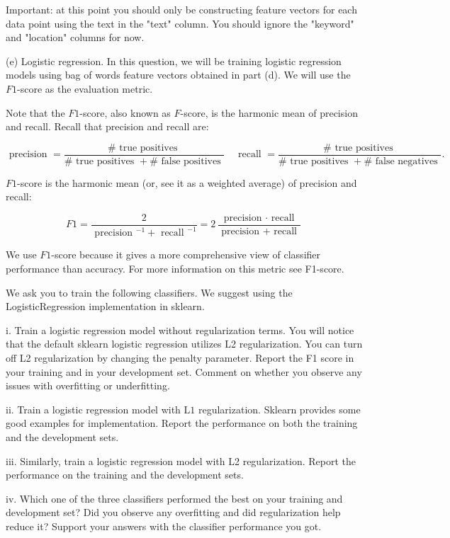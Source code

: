\documentclass[10pt]{article}
\begin{document}
Important: at this point you should only be constructing feature vectors for each data point using the text in the "text" column. You should ignore the "keyword" and "location" columns for now.

(e) Logistic regression. In this question, we will be training logistic regression models using bag of words feature vectors obtained in part (d). We will use the $F 1$-score as the evaluation metric.

Note that the $F 1$-score, also known as $F$-score, is the harmonic mean of precision and recall. Recall that precision and recall are:

$$
\text { precision }=\frac{\# \text { true positives }}{\# \text { true positives }+\# \text { false positives }} \quad \text { recall }=\frac{\# \text { true positives }}{\# \text { true positives }+\# \text { false negatives }} \text {. }
$$

$F 1$-score is the harmonic mean (or, see it as a weighted average) of precision and recall:

$$
F 1=\frac{2}{\text { precision }^{-1}+\text { recall }^{-1}}=2 \frac{\text { precision } \cdot \text { recall }}{\text { precision }+ \text { recall }}
$$

We use $F 1$-score because it gives a more comprehensive view of classifier performance than accuracy. For more information on this metric see F1-score.

We ask you to train the following classifiers. We suggest using the LogisticRegression implementation in sklearn.

i. Train a logistic regression model without regularization terms. You will notice that the default sklearn logistic regression utilizes L2 regularization. You can turn off L2 regularization by changing the penalty parameter. Report the F1 score in your training and in your development set. Comment on whether you observe any issues with overfitting or underfitting.

ii. Train a logistic regression model with $\mathrm{L} 1$ regularization. Sklearn provides some good examples for implementation. Report the performance on both the training and the development sets.

iii. Similarly, train a logistic regression model with L2 regularization. Report the performance on the training and the development sets.

iv. Which one of the three classifiers performed the best on your training and development set? Did you observe any overfitting and did regularization help reduce it? Support your answers with the classifier performance you got.
\end{document}
